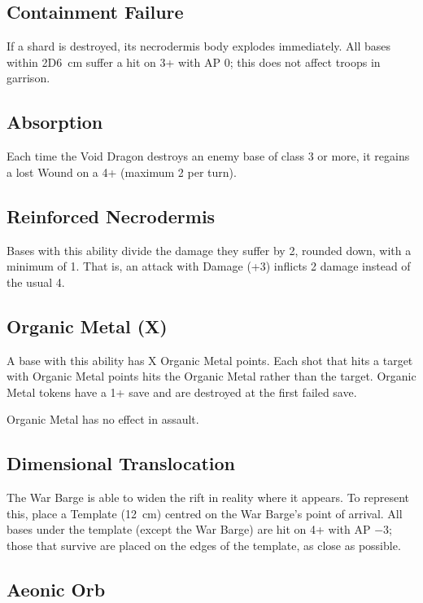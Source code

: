 \subsection{Containment Failure}

If a shard is destroyed, its necrodermis body explodes immediately. All bases within 2D6~cm suffer a hit on 3+ with AP 0; this does not affect troops in garrison.

\subsection{Absorption}

Each time the Void Dragon destroys an enemy base of class 3 or more, it regains a lost Wound on a 4+ (maximum 2 per turn).

\subsection{Reinforced Necrodermis}

Bases with this ability divide the damage they suffer by 2, rounded down, with a minimum of 1. That is, an attack with Damage (+3) inflicts 2 damage instead of the usual 4.

\subsection{Organic Metal (X)}

A base with this ability has X Organic Metal points. Each shot that hits a target with Organic Metal points hits the Organic Metal rather than the target. Organic Metal tokens have a 1+ save and are destroyed at the first failed save.

Organic Metal has no effect in assault.

\subsection{Dimensional Translocation}

The War Barge is able to widen the rift in reality where it appears. To represent this, place a Template (12~cm) centred on the War Barge's point of arrival. All bases under the template (except the War Barge) are hit on 4+ with AP $-3$; those that survive are placed on the edges of the template, as close as possible.

\subsection{Aeonic Orb}

